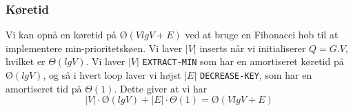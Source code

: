 \subsubsection{Køretid}
Vi kan opnå en køretid på $Ø(VlgV + E)$ ved at bruge en Fibonacci hob til at implementere min-prioritetskøen. Vi laver $|V|$ inserts når vi initialiserer $Q=G.V$, hvilket er $\Theta(lgV)$. Vi laver $|V|$ \texttt{EXTRACT-MIN} som har en amortiseret køretid på $Ø(lgV)$, og så i hvert loop laver vi højst $|E|$ \texttt{DECREASE-KEY}, som har en amortiseret tid på $\Theta(1)$. Dette giver at vi har
$$|V| \cdot Ø(lgV) + |E|\cdot \Theta(1) = Ø(VlgV + E)$$
